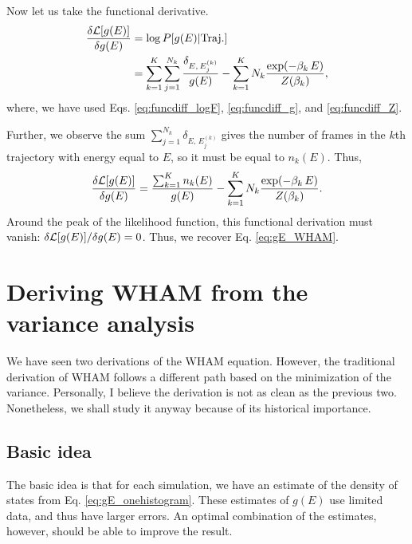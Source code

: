 \documentclass[aip,jcp,preprint,superscriptaddress]{revtex4-1}
\begin{document}
Now let us take the functional derivative.
%
\begin{align}
\frac{ \delta \mathcal{L}[g(E)] }
     { \delta g(E) }
&=
\log P[g(E)|\mathrm{Traj.}]
\notag \\
&=
\sum_{k = 1}^K
\sum_{j = 1}^{N_k}
\frac{ \delta_{E, \, E^{(k)}_j} }
     { g( E ) }
-
\sum_{k = 1}^K
N_k
\frac{ \exp(-\beta_k \, E) }
     { Z(\beta_k) },
\end{align}
where,
we have used Eqs.
\eqref{eq:funcdiff_logF},
\eqref{eq:funcdiff_g},
and
\eqref{eq:funcdiff_Z}.




Further,
we observe the sum
$\sum_{j = 1}^{N_k} \delta_{E, \, E^{(k)}_j}$
gives the number of frames in the $k$th trajectory
with energy equal to $E$,
so it must be equal to $n_k(E)$.
%
Thus,
\begin{align}
\frac{ \delta \mathcal{L}[g(E)] }
     { \delta g(E) }
=
\frac{  \sum_{k = 1}^K n_k(E) }
     { g( E ) }
-
\sum_{k = 1}^K
N_k
\frac{ \exp(-\beta_k \, E) }
     { Z(\beta_k) }.
\end{align}
%
Around the peak of the likelihood function,
this functional derivation must vanish:
$\delta \mathcal{L}[g(E)]/ \delta g(E) = 0$.
%
Thus,
we recover Eq. \eqref{eq:gE_WHAM}.




\section{\label{sec:WHAM_var}
Deriving WHAM from the variance analysis}




We have seen two derivations of the WHAM equation.
%
However, the traditional derivation of WHAM\cite{
ferrenberg1988, *ferrenberg1989, kumar1992,
newman, frenkel}
follows a different path
based on the minimization of the variance.
%
Personally,
I believe the derivation
is not as clean as the previous two.
%
Nonetheless,
we shall study it anyway
because of its historical importance.



\subsection{Basic idea}


The basic idea is that
for each simulation,
we have an estimate of the density of states
from Eq. \eqref{eq:gE_onehistogram}.
%
These estimates of $g(E)$
use limited data, and thus have larger errors.
%
An optimal combination of the estimates, however,
should be able to improve the result.
\end{document}
